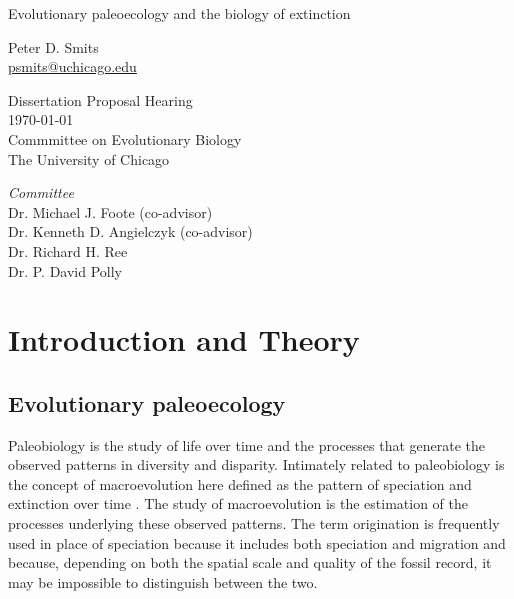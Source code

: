 \documentclass[12pt,letterpaper]{article}
\begin{document}
\setcounter{secnumdepth}{0}

\begin{titlepage}
  \begin{center}
    \huge{Evolutionary paleoecology and the biology of extinction}

    \vspace{1.5cm}

    \large{Peter D. Smits \\}
    \footnotesize{\href{mailto:psmits@uchicago.edu}{psmits@uchicago.edu}}

    \vspace{1.5cm}

    Dissertation Proposal Hearing \\
    \today \\
    Commmittee on Evolutionary Biology \\
    The University of Chicago

    \vspace{1.5cm}

    \textit{Committee} \\
    Dr. Michael J. Foote (co-advisor) \\
    Dr. Kenneth D. Angielczyk (co-advisor) \\
    Dr. Richard H. Ree \\
    Dr. P. David Polly
  \end{center}
\end{titlepage}

\linenumbers
\modulolinenumbers[2]


\section{Introduction and Theory}

\subsection{Evolutionary paleoecology}
Paleobiology is the study of life over time and the processes that generate the observed patterns in diversity and disparity. Intimately related to paleobiology is the concept of macroevolution here defined as the pattern of speciation and extinction over time \citep{Jablonski2008a}. The study of macroevolution is the estimation of the processes underlying these observed patterns. The term origination is frequently used in place of speciation because it includes both speciation and migration and because, depending on both the spatial scale and quality of the fossil record, it may be impossible to distinguish between the two.
\end{document}
